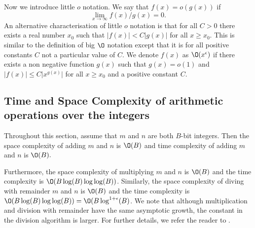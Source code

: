 Now we introduce little $o$ notation. We say that $f(x)=o(g(x))$ if $$\lim_{x\to\infty} f(x)/g(x)=0.$$ An alternative characterisation of little $o$ notation is that for all $C>0$ there exists a real number $x_0$ such that $\vert f(x)\vert<C\vert g(x)\vert$ for all $x\geq x_0$. This is similar to the definition of big $\O$ notation except that it is for all positive constants $C$ not a particular value of $C$. We denote $f(x)$ as $\O(x^\epsilon)$ if there exists a non negative function $g(x)$ such that $g(x)=o(1)$ and $\vert f(x)\vert\leq C\vert x^{g(x)}\vert$ for all $x\geq x_0$ and a positive constant $C$. 

\subsection{Time and Space Complexity of arithmetic operations over the integers}

Throughout this section, assume that $m$ and $n$ are both $B$-bit integers. Then the space complexity of adding $m$ and $n$ is $\O(B)$  and time complexity of adding $m$ and $n$ is $\O(B).$ 

Furthermore, the space complexity  of multiplying $m$ and $n$ is $\O(B)$ and the time complexity is $\O(B\log(B)\log\log(B))$. Similarly, the space complexity  of diving with remainder $m$ and $n$ is $\O(B)$ and the time complexity is $\O(B\log(B)\log\log(B))=\O(B\log^{1+\epsilon}(B)$. We note that although multiplication and division with remainder have the same asymptotic growth, the constant in the division algorithm is larger. For further details, we refer the reader to \cite[Ch.8,9]{vzGG99}.

\subsection{}